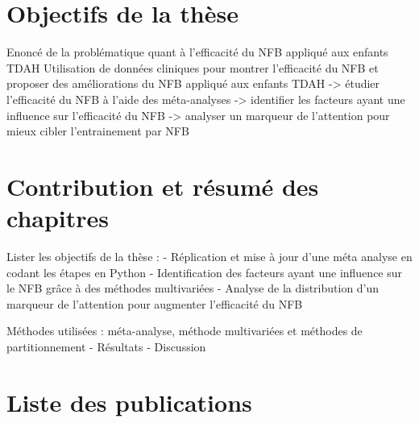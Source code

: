 \section{Objectifs de la thèse}
Enoncé de la problématique quant à l’efficacité du NFB appliqué aux enfants TDAH
Utilisation de données cliniques pour montrer l'efficacité du NFB et proposer des améliorations du NFB appliqué aux enfants TDAH
-> étudier l'efficacité du NFB à l'aide des méta-analyses
-> identifier les facteurs ayant une influence sur l'efficacité du NFB
-> analyser un marqueur de l'attention pour mieux cibler l'entrainement par NFB

\section{Contribution et résumé des chapitres}
Lister les objectifs de la thèse :
- Réplication et mise à jour d’une méta analyse en codant les étapes en Python
- Identification des facteurs ayant une influence sur le NFB grâce à des méthodes multivariées
- Analyse de la distribution d’un marqueur de l’attention pour augmenter l’efficacité du NFB

Méthodes utilisées : méta-analyse, méthode multivariées et méthodes de partitionnement
- Résultats
- Discussion

\section{Liste des publications}